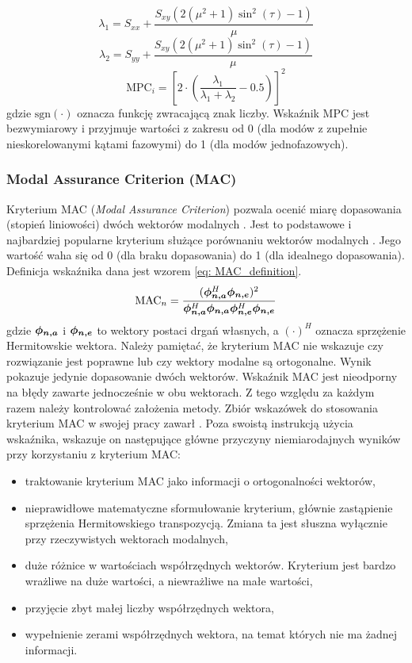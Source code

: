 \begin{equation}
	\lambda_{1}=S_{xx}+\frac{S_{xy}(2(\mu^{2}+1)\sin^{2}{(\tau)}-1)}{\mu}
\end{equation}
\begin{equation}
	\lambda_{2}=S_{yy}+\frac{S_{xy}(2(\mu^{2}+1)\sin^{2}{(\tau)}-1)}{\mu}
\end{equation}
\begin{equation} \label{eq:mpc_ratio}
	\mathrm{MPC}_{i}=\left[2\cdot\left(\frac{\lambda_{1}}{\lambda_{1}+\lambda_{2}}-0.5\right)\right]^{2}
\end{equation}
gdzie $\mathrm{sgn}(\cdot)$ oznacza funkcję zwracającą znak liczby. Wskaźnik MPC jest bezwymiarowy i przyjmuje wartości z zakresu od 0 (dla modów z zupełnie nieskorelowanymi kątami fazowymi) do 1 (dla modów jednofazowych).
\subsubsection{Modal Assurance Criterion (MAC)}

Kryterium MAC (\textit{Modal Assurance Criterion}) pozwala ocenić miarę dopasowania (stopień liniowości) dwóch wektorów modalnych \parencite{Allemang1982}. Jest to podstawowe i najbardziej popularne kryterium służące porównaniu wektorów modalnych \cite{Rainieri2014}. Jego wartość waha się od 0 (dla braku dopasowania) do 1 (dla idealnego dopasowania). Definicja wskaźnika dana jest wzorem \ref{eq: MAC_definition}.
\begin{equation} \label{eq: MAC_definition}
	\text{MAC}_n = \frac{ (\bm{\phi_{n,a}}^H\bm{\phi_{n,e}})^2}
	{\bm{\phi_{n,a}}^H\bm{\phi_{n,a}}\bm{\phi_{n,e}}^H\bm{\phi_{n,e}}}
\end{equation}
gdzie $\bm{\phi_{n,a}}$ i $\bm{\phi_{n,e}}$ to wektory postaci drgań własnych, a $(\cdot)^H$ oznacza sprzężenie Hermitowskie wektora.
Należy pamiętać, że kryterium MAC nie wskazuje czy rozwiązanie jest poprawne lub czy wektory modalne są ortogonalne. Wynik pokazuje jedynie dopasowanie dwóch wektorów. Wskaźnik MAC jest nieodporny na błędy zawarte jednocześnie w obu wektorach. Z tego względu za każdym razem należy kontrolować założenia metody. Zbiór wskazówek do stosowania kryterium MAC w swojej pracy zawarł \cite{Allemang2003}. Poza swoistą instrukcją użycia wskaźnika, wskazuje on następujące główne przyczyny niemiarodajnych wyników przy korzystaniu z kryterium MAC:
\begin{itemize}
	\item traktowanie kryterium MAC jako informacji o ortogonalności wektorów,
	\item nieprawidłowe matematyczne sformułowanie kryterium, głównie zastąpienie sprzężenia Hermitowskiego transpozycją. Zmiana ta jest słuszna wyłącznie przy rzeczywistych wektorach modalnych,
	\item duże różnice w wartościach współrzędnych wektorów. Kryterium jest bardzo wrażliwe na duże wartości, a niewrażliwe na małe wartości,
	\item przyjęcie zbyt małej liczby współrzędnych wektora,
	\item wypełnienie zerami współrzędnych wektora, na temat których nie ma żadnej informacji.
\end{itemize}

